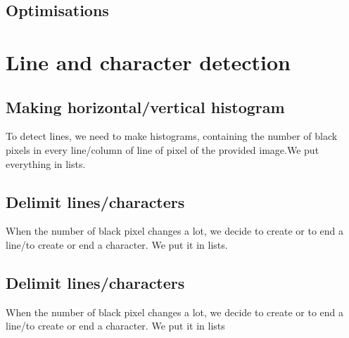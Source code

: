 \subsection{Optimisations}

\begin{center}
\end{center}

\begin{center}
\end{center}

\section{Line and character detection}

\subsection{Making horizontal/vertical histogram}

To detect lines, we need to make histograms, containing the number of black pixels in every line/column of line of pixel of the provided image.We put everything in lists.

\subsection{Delimit lines/characters}

When the number of black pixel changes a lot, we decide to create or to end a line/to create or end a character. We put it in lists.

\subsection{Delimit lines/characters}

When the number of black pixel changes a lot, we decide to create or to end a line/to create or end a character. We put it in lists
